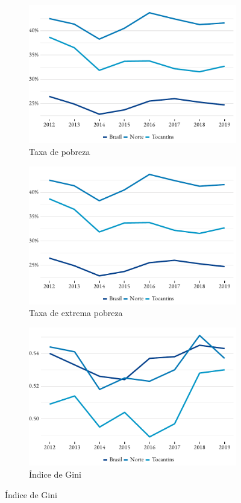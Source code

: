 \begin{figure}[!h]
	\begin{subfigure}{\linewidth}
		\caption{Taxa de pobreza}
		\includegraphics{fig/taxa_pobreza.pdf}
	\end{subfigure}
	\begin{subfigure}{\linewidth}
		\caption{Taxa de extrema pobreza}
		\includegraphics{fig/taxa_pobreza.pdf}
	\end{subfigure}
	\begin{subfigure}{\linewidth}
		\caption{Índice de Gini}
		\includegraphics{fig/gini.pdf}
	\end{subfigure}
\end{figure}
